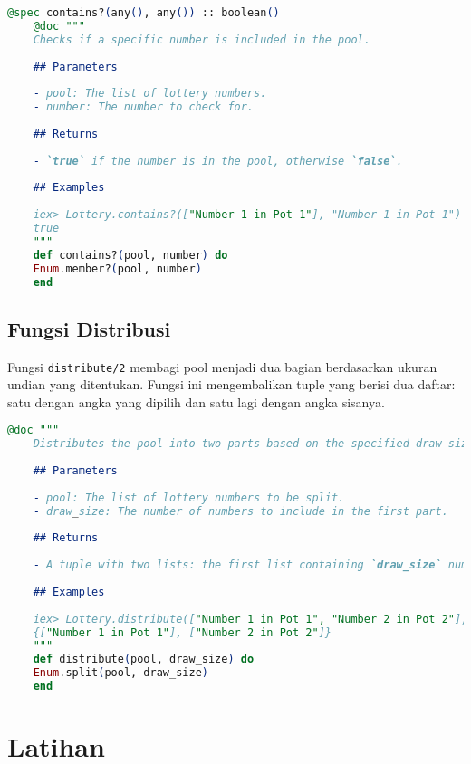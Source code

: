 \begin{lstlisting}[language=elixir, caption={Fungsi Pemeriksaan Angka}]
	@spec contains?(any(), any()) :: boolean()
	@doc """
	Checks if a specific number is included in the pool.
	
	## Parameters
	
	- pool: The list of lottery numbers.
	- number: The number to check for.
	
	## Returns
	
	- `true` if the number is in the pool, otherwise `false`.
	
	## Examples
	
	iex> Lottery.contains?(["Number 1 in Pot 1"], "Number 1 in Pot 1")
	true
	"""
	def contains?(pool, number) do
	Enum.member?(pool, number)
	end
\end{lstlisting}

\subsection{Fungsi Distribusi}

Fungsi \texttt{distribute/2} membagi pool menjadi dua bagian berdasarkan ukuran undian yang ditentukan. Fungsi ini mengembalikan tuple yang berisi dua daftar: satu dengan angka yang dipilih dan satu lagi dengan angka sisanya.

\begin{lstlisting}[language=elixir, caption={Fungsi Distribusi}]
	@doc """
	Distributes the pool into two parts based on the specified draw size.
	
	## Parameters
	
	- pool: The list of lottery numbers to be split.
	- draw_size: The number of numbers to include in the first part.
	
	## Returns
	
	- A tuple with two lists: the first list containing `draw_size` numbers, and the second list containing the remaining numbers.
	
	## Examples
	
	iex> Lottery.distribute(["Number 1 in Pot 1", "Number 2 in Pot 2"], 1)
	{["Number 1 in Pot 1"], ["Number 2 in Pot 2"]}
	"""
	def distribute(pool, draw_size) do
	Enum.split(pool, draw_size)
	end
\end{lstlisting}



\section{Latihan}
